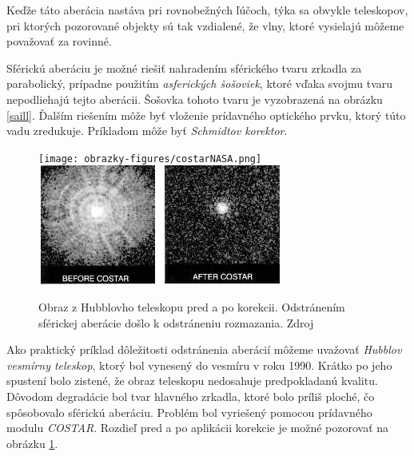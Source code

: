 Keďže táto aberácia nastáva pri rovnobežných ľúčoch, týka sa obvykle teleskopov, pri ktorých
pozorované objekty sú tak vzdialené, že vlny, ktoré vysielajú môžeme považovať za rovinné.

Sférickú aberáciu je možné riešiť nahradením sférického tvaru zrkadla za parabolický,
prípadne použitím \textit{asferických šošoviek}, ktoré vďaka svojmu tvaru nepodliehajú tejto
aberácii. Šošovka tohoto tvaru je vyzobrazená na obrázku \ref{saill}. Ďalším riešením
môže byť vloženie prídavného optického prvku, ktorý túto vadu zredukuje. Príkladom môže
byť \textit{Schmidtov korektor}.

\begin{figure}
    \centering
    \texttt{[image: obrazky-figures/costarNASA.png]}
    \includegraphics[scale=0.6]{obrazky-figures/cosar.png}
    \caption{Obraz z Hubblovho teleskopu pred a po korekcii. Odstránením sférickej aberácie došlo k
    odstráneniu rozmazania. Zdroj\cite{nasaHubble}}
    \label{hubbleImage}
\end{figure}


Ako praktický príklad dôležitosti odstránenia aberácií môžeme uvažovať \textit{Hubblov vesmírny
teleskop},
ktorý bol vynesený do vesmíru v roku 1990. Krátko po jeho spustení bolo zistené, že obraz
teleskopu nedosahuje predpokladanú kvalitu. Dôvodom degradácie bol tvar hlavného zrkadla, ktoré bolo
príliš ploché, čo spôsobovalo sférickú aberáciu. Problém bol vyriešený pomocou prídavného modulu
\textit{COSTAR}\cite{hechtoptics}. Rozdieľ pred a po aplikácii korekcie je možné pozorovať na obrázku
\ref{hubbleImage}. 

